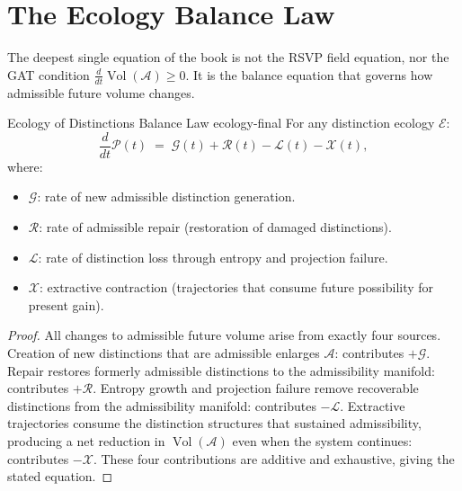 \documentclass[12pt,twoside,openright]{book}
\newcommand{\adm}{\mathcal{A}}
\newcommand{\Vol}{\operatorname{Vol}}
\begin{document}
\section{The Ecology Balance Law}
\label{sec:ch30-conservation}

The deepest single equation of the book is not the
RSVP field equation, nor the GAT condition
$\frac{d}{dt}\Vol(\adm) \ge 0$.
It is the balance equation that governs how admissible
future volume changes.

\begin{theorem}{Ecology of Distinctions Balance Law}%
  {ecology-final}
  For any distinction ecology $\mathcal{E}$:
  \[
    \frac{d}{dt}\mathcal{P}(t)
    \;=\;
    \mathcal{G}(t) + \mathcal{R}(t)
    - \mathcal{L}(t) - \mathcal{X}(t),
  \]
  where:
  \begin{itemize}[nosep]
    \item $\mathcal{G}$: rate of new admissible
          distinction generation.
    \item $\mathcal{R}$: rate of admissible repair
          (restoration of damaged
          distinctions).
    \item $\mathcal{L}$: rate of distinction loss
          through entropy and projection failure.
    \item $\mathcal{X}$: extractive contraction
          (trajectories that consume future possibility
          for present gain).
  \end{itemize}
\end{theorem}

\begin{proof}
  All changes to admissible future volume arise from
  exactly four sources.
  Creation of new distinctions that are admissible
  enlarges $\adm$: contributes $+\mathcal{G}$.
  Repair restores formerly admissible distinctions
  to the admissibility manifold: contributes $+\mathcal{R}$.
  Entropy growth and projection failure remove recoverable
  distinctions from the admissibility manifold:
  contributes $-\mathcal{L}$.
  Extractive trajectories consume the distinction
  structures that sustained admissibility, producing
  a net reduction in $\Vol(\adm)$ even when the system
  continues: contributes $-\mathcal{X}$.
  These four contributions are additive and exhaustive,
  giving the stated equation.
\end{proof}
\end{document}
